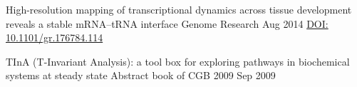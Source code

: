 \documentclass{klmr-cv}
\begin{document}
\begin{bibliography}
    {High-resolution mapping of transcriptional dynamics across tissue
        development reveals a stable mRNA--tRNA interface}
    {Genome Research}
    {Aug 2014}
    {\href{http://dx.doi.org/10.1101/gr.176784.114}{DOI: 10.1101/gr.176784.114}}

    {TInA (T-Invariant Analysis): a tool box for exploring pathways in
        biochemical systems at steady state}
    {Abstract book of CGB 2009}
    {Sep 2009}
    {}
\end{bibliography}
\end{document}
